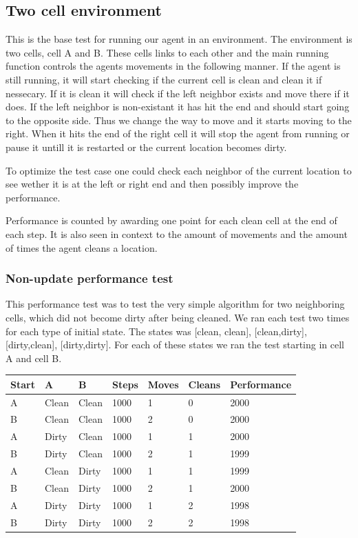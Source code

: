 \subsection{Two cell environment}
This is the base test for running our agent in an environment.  The environment
is two cells, cell A and B. These cells links to each other and the main running
function controls the agents movements in the following manner. If the agent is
still running, it will start checking if the current cell is clean and clean it
if nessecary.  If it is clean it will check if the left neighbor exists and move
there if it does.  If the left neighbor is non-existant it has hit the end and
should start going to the opposite side. Thus we change the way to move and it
starts moving to the right. When it hits the end of the right cell it will stop
the agent from running or pause it untill it is restarted or the current
location becomes dirty.

To optimize the test case one could check each neighbor of the current location
to see wether it is at the left or right end and then possibly improve the
performance.

Performance is counted by awarding one point for each clean cell at the end of
each step.  It is also seen in context to the amount of movements and the amount
of times the agent cleans a location.

\subsubsection{Non-update performance test}
This performance test was to test the very simple algorithm for two neighboring
cells, which did not become dirty after being cleaned.  We ran each test two
times for each type of initial state. The states was [clean, clean],
[clean,dirty], [dirty,clean], [dirty,dirty].  For each of these states we ran
the test starting in cell A and cell B.

\begin{longtable}{p{} p{} p{} 
									p{} p{} p{} 
									p{}}
Start	& A & B & Steps & Moves & Cleans & Performance \\\hline
A & Clean & Clean & 1000 & 1 & 0 & 2000 \\
B & Clean & Clean & 1000 & 2 & 0 & 2000 \\
A & Dirty & Clean & 1000 & 1 & 1 & 2000 \\
B & Dirty & Clean & 1000 & 2 & 1 & 1999 \\
A & Clean & Dirty & 1000 & 1 & 1 & 1999 \\
B & Clean & Dirty & 1000 & 2 & 1 & 2000 \\
A & Dirty & Dirty & 1000 & 1 & 2 & 1998 \\
B & Dirty & Dirty & 1000 & 2 & 2 & 1998 \\
\end{longtable}


